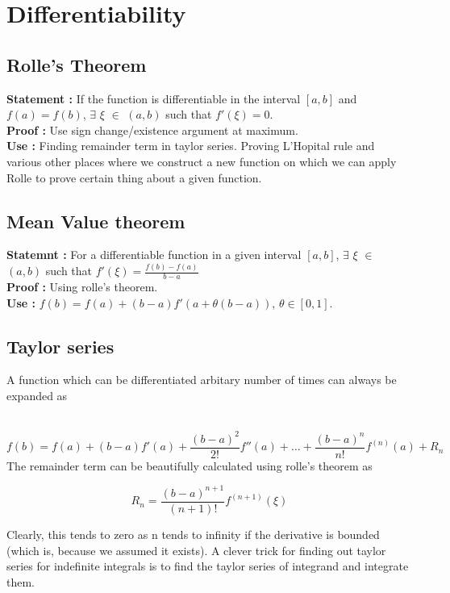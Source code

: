 \documentclass{report}
\begin{document}
\section{Differentiability}
\subsection{Rolle's Theorem}
\textbf{Statement :} If the function is differentiable in the interval $[a,b]$ and $f(a) = f(b)$, $\exists$ $\xi$ $\in$ $(a,b)$ such that $f'(\xi) = 0$. \\

\noindent\textbf{Proof :} Use sign change/existence argument at maximum.\\

\noindent\textbf{Use :} Finding remainder term in taylor series. Proving L'Hopital rule and various other places where we construct a new function on which we can apply Rolle to prove certain thing about a given function.\\

\subsection{Mean Value theorem}
\textbf{Statemnt :} For a differentiable function in a given interval $[a,b]$, $\exists$ $\xi$ $\in$ $(a,b)$ such that $f'(\xi) = \frac{f(b)-f(a)}{b-a}$ \\

\noindent\textbf{Proof :} Using rolle's theorem.\\

\noindent\textbf{Use :} $f(b) = f(a) + (b-a) f'(a+\theta (b-a))$, $\theta \in [0,1]$.

\subsection{Taylor series}
A function which can be differentiated arbitary number of times can always be expanded as \\\

\begin{equation}
f(b) = f(a) + (b-a)f'(a) + \frac{(b-a)^2}{2!}f''(a) + \dots + \frac{(b-a)^n}{n!}f^{(n)}(a) + R_n
\end{equation}
The remainder term can be beautifully calculated using rolle's theorem as 

$$R_n = \frac{(b-a)^{n+1}}{(n+1)!} f^{(n+1)}(\xi)$$

\noindent Clearly, this tends to zero as n tends to infinity if the derivative is bounded (which is, because we assumed it exists). A clever trick for finding out taylor series for indefinite integrals is to find the taylor series of integrand and integrate them.
\end{document}
